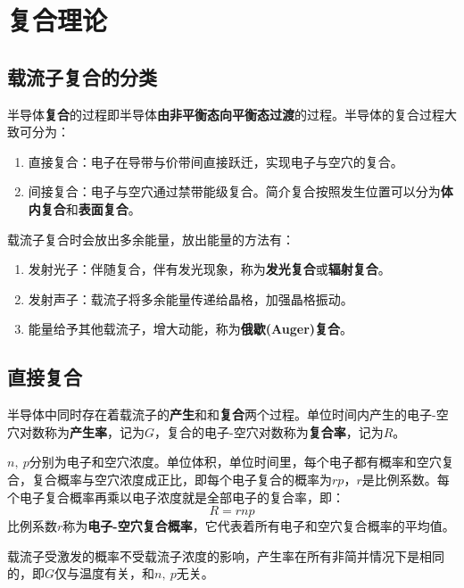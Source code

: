 \section{复合理论}

\subsection{载流子复合的分类}

半导体\textbf{复合}的过程即半导体\textbf{由非平衡态向平衡态过渡}的过程。半导体的复合过程大致可分为：
\begin{enumerate}
    \item 直接复合：电子在导带与价带间直接跃迁，实现电子与空穴的复合。
    \item 间接复合：电子与空穴通过禁带能级复合。简介复合按照发生位置可以分为\textbf{体内复合}和\textbf{表面复合}。
\end{enumerate}
载流子复合时会放出多余能量，放出能量的方法有：
\begin{enumerate}
    \item 发射光子：伴随复合，伴有发光现象，称为\textbf{发光复合}或\textbf{辐射复合}。
    \item 发射声子：载流子将多余能量传递给晶格，加强晶格振动。
    \item 能量给予其他载流子，增大动能，称为\textbf{俄歇(Auger)复合}。
\end{enumerate}

\subsection{直接复合}

半导体中同时存在着载流子的\textbf{产生}和和\textbf{复合}两个过程。单位时间内产生的电子-空穴对数称为\textbf{产生率}，记为$G$，复合的电子-空穴对数称为\textbf{复合率}，记为$R$。

$n,\ p$分别为电子和空穴浓度。单位体积，单位时间里，每个电子都有概率和空穴复合，复合概率与空穴浓度成正比，即每个电子复合的概率为$rp$，$r$是比例系数。每个电子复合概率再乘以电子浓度就是全部电子的复合率，即：
\begin{equation}
    R=rnp
\end{equation}
比例系数$r$称为\textbf{电子-空穴复合概率}，它代表着所有电子和空穴复合概率的平均值。

载流子受激发的概率不受载流子浓度的影响，产生率在所有非简并情况下是相同的，即$G$仅与温度有关，和$n,\ p$无关。

